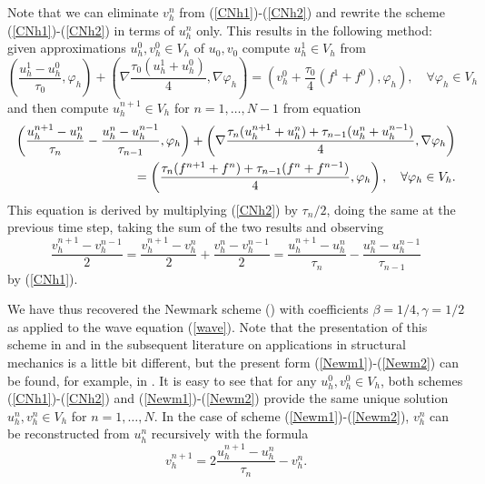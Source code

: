 \documentclass{imanum}
\begin{document}
Note that we can eliminate $v_h^n$ from (\ref{CNh1})-(\ref{CNh2}) and rewrite the scheme (\ref{CNh1})-(\ref{CNh2}) in terms of $u_h^n$ only. This results in the following method:
given approximations $u^0_h, v^0_h \in V_h$ of $u_0, v_0$ compute $u^1_h \in V_h$ from
\begin{equation}
    \label{Newm1}\left( \frac{u^1_h - u^0_h}{\tau_0}, \varphi_h \right) + \left( \nabla\frac{\tau_0 (u^1_h + u^0_h)}{4}, \nabla \varphi_h \right) 
    = \left( v_h^0 +\frac{\tau_0}{4} (f^1 + f^0), \varphi_h \right), \quad \forall\varphi_h \in V_h
\end{equation}
and then compute $u^{n+1}_h \in V_h$ for $n = 1, \ldots, N-1$ from equation
\begin{align}
   \left( \frac{u_h^{n + 1} - u_h^n}{\tau_n} - \frac{u_h^n - u_h^{n -1}}{\tau_{n - 1}}, \varphi_h \right) + \left( \nabla \frac{\tau_n (u_h^{n + 1}+ u_h^n) + \tau_{n - 1} (u_h^n + u_h^{n - 1})}{4}, \nabla \varphi_h \right)&\notag\\
   =\left( \frac{\tau_n (f^{n + 1} + f^n) + \tau_{n - 1} (f^n + f^{n - 1})}{4},\varphi_h \right), \hspace{1em} \forall \varphi_h \in V_h.&
   \label{Newm2}
\end{align}
This equation is derived by multiplying (\ref{CNh2}) by $\tau_n/2$, doing the same at the previous time step, taking the sum of the two results and observing 
$$
\frac{v_h^{n+1}-v_h^{n-1}}{2}
=\frac{v_h^{n+1}-v_h^{n}}{2}+\frac{v_h^{n}-v_h^{n-1}}{2}
=\frac{u_h^{n + 1} - u_h^n}{\tau_n} - \frac{u_h^n - u_h^{n -1}}{\tau_{n - 1}}
$$
by (\ref{CNh1}).

We have thus recovered the Newmark scheme (\cite{newmark1959, RT}) with coefficients $\beta =
1/4, \gamma = 1/2$ as applied to the wave equation
(\ref{wave}). Note that the presentation of this scheme in {\cite{newmark1959}} and in
the subsequent literature on applications in structural mechanics is a little
bit different, but the present form (\ref{Newm1})-(\ref{Newm2}) can be found, for example, in {\cite{RT}}. It is easy to see that for any $u^0_h, v^0_h \in V_h  $, both schemes (\ref{CNh1})-(\ref{CNh2}) and (\ref{Newm1})-(\ref{Newm2})
provide the same unique solution $u^n_h, v^n_h \in V_h$ for $n = 1, \ldots, N$.
In the case of scheme (\ref{Newm1})-(\ref{Newm2}), $v^n_h$ can be reconstructed from $u^n_h$ recursively with the formula
\begin{equation}\label{vhform}
     v_h^{n + 1} = 2 \frac{u_h^{n + 1} - u_h^n}{\tau_n} - v_h^n.
\end{equation}
\end{document}
